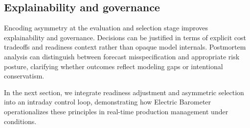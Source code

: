 \subsection{Explainability and governance}
\label{subsec:asymmetry-governance}

Encoding asymmetry at the evaluation and selection stage improves explainability and governance.
Decisions can be justified in terms of explicit cost tradeoffs and readiness context rather than opaque
model internals. Postmortem analysis can distinguish between forecast misspecification and
appropriate risk posture, clarifying whether outcomes reflect modeling gaps or intentional
conservatism.

In the next section, we integrate readiness adjustment and asymmetric selection into an intraday
control loop, demonstrating how Electric Barometer operationalizes these principles in real-time
production management under \LTO{} conditions.
